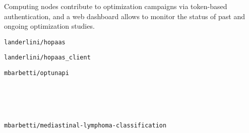 \begin{cvcontent}
{  Computing nodes contribute to optimization campaigns via token-based
  authentication, and a web dashboard allows to monitor the status of
  past and ongoing optimization studies.}
  \\ [1.5mm]
  \begin{itemize*}[label=\textcolor{iconcolor}{\textbullet}]
    \item \texttt{landerlini/hopaas} \hfill
      \href{https://hopaas.cloud.infn.it}{\faGlobe}
    \\ [0.5mm]
    \item \texttt{landerlini/hopaas\_client} \hfill
      \href{https://github.com/landerlini/hopaas_client}{\faGithub}
    \\ [0.5mm]
    \item \texttt{mbarbetti/optunapi} \hfill
      \href{https://pypi.org/project/optunapi}{\faPython}
      \href{https://github.com/mbarbetti/optunapi}{\faGithub}
  \end{itemize*}
  \\ [6mm]
  \\ [1.5mm]
  \\ [1.5mm]
  \begin{itemize*}[label=\textcolor{iconcolor}{\textbullet}]
    \item \texttt{mbarbetti/mediastinal-lymphoma-classification} \hfill
      \href{https://github.com/mbarbetti/mediastinal-lymphoma-classification}{\faGithub}
  \end{itemize*}
  \newpage\noindent
  \\ [1.5mm]
  \\ [1.5mm]
  \begin{itemize*}[label=\textcolor{iconcolor}{\textbullet}]

\end{itemize*}
\end{cvcontent}
